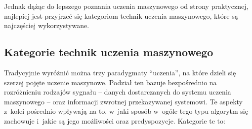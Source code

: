 Jednak dążąc do lepszego poznania uczenia maszynowego od strony praktycznej, najlepiej jest przyjrzeć się kategoriom technik uczenia maszynowego, które są najczęściej wykorzystywane.

\subsection{Kategorie technik uczenia maszynowego}

Tradycyjnie wyróżnić można trzy paradygmaty ``uczenia'', na które dzieli się szerzej pojęte uczenie maszynowe.
Podział ten bazuje bezpośrednio na rozróżnieniu rodzajów sygnału -- danych dostarczanych do systemu uczenia maszynowego -- oraz informacji zwrotnej przekazywanej systemowi.
Te aspekty z~kolei pośrednio wpływają na to, w~jaki sposób w~ogóle tego typu algorytm się zachowuje i~jakie są jego możliwości oraz predyspozycje.
Kategorie te to:


